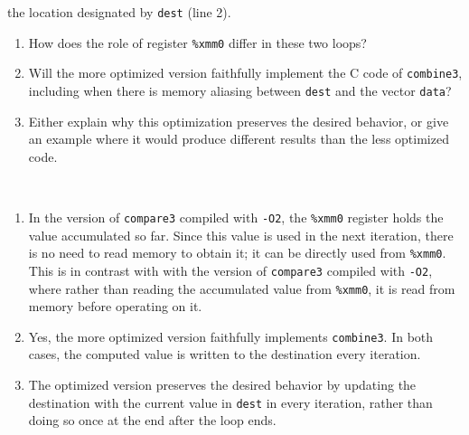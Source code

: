 \documentclass[12pt]{article}
\newenvironment{ex}[2][Exercise]{\begin{trivlist}
		\item[\hskip \labelsep {\bfseries #1}\hskip \labelsep {\bfseries #2.}]}{\end{trivlist}}
\newenvironment{sol}[1][Solution]{\begin{trivlist}
		\item[\hskip \labelsep {\bfseries #1:}]}{\end{trivlist}}
\begin{document}
\begin{ex}{5.4}
	the location designated by \texttt{dest} (line 2).
	\begin{enumerate}[label=(\alph*)]
		\item How does the role of register \texttt{\%xmm0} differ in these two loops?
		\item Will the more optimized version faithfully implement the C code of \texttt{combine3},
		including when there is memory aliasing between \texttt{dest} and the vector
		\texttt{data}?
		\item Either explain why this optimization preserves the desired behavior, or give an
		example where it would produce different results than the less optimized code.
	\end{enumerate}
\end{ex}

\begin{sol}
	\
	\begin{enumerate}[label=(\alph*)]
		\item In the version of \texttt{compare3} compiled with \texttt{-O2}, the \texttt{\%xmm0}
		register holds the value accumulated so far. Since this value is used in the next iteration,
		there is no need to read memory to obtain it; it can be directly used from \texttt{\%xmm0}.
		This is in contrast with with the version of \texttt{compare3} compiled with \texttt{-O2},
		where rather than reading the accumulated value from \texttt{\%xmm0}, it is read from
		memory before operating on it.
		\item Yes, the more optimized version faithfully implements \texttt{combine3}.
		In both cases, the computed value is written to the destination every iteration.
		\item The optimized version preserves the desired behavior by updating the destination
		with the current value in \texttt{dest} in every iteration, rather than doing so
		once at the end after the loop ends.
	\end{enumerate}
\end{sol}
\end{document}
